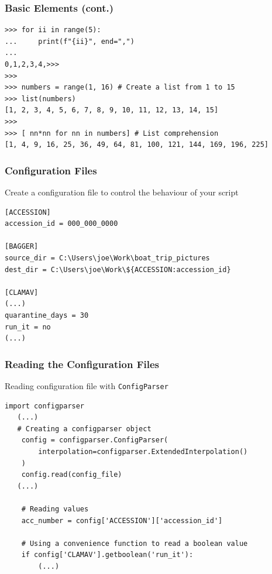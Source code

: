 \documentclass[aspectratio=169]{beamer}
\begin{document}
\begin{frame}[fragile]
\frametitle{Basic Elements (cont.)}
\scriptsize
\begin{verbatim}
>>> for ii in range(5):
...     print(f"{ii}", end=",")
...
0,1,2,3,4,>>>
>>>
>>> numbers = range(1, 16) # Create a list from 1 to 15
>>> list(numbers)
[1, 2, 3, 4, 5, 6, 7, 8, 9, 10, 11, 12, 13, 14, 15]
>>>
>>> [ nn*nn for nn in numbers] # List comprehension
[1, 4, 9, 16, 25, 36, 49, 64, 81, 100, 121, 144, 169, 196, 225]
\end{verbatim}
\normalsize
\end{frame}


\begin{frame}[fragile]
\frametitle{Configuration Files}
Create a configuration file to control the behaviour of your script

\scriptsize
\begin{verbatim}
[ACCESSION]
accession_id = 000_000_0000

[BAGGER]
source_dir = C:\Users\joe\Work\boat_trip_pictures
dest_dir = C:\Users\joe\Work\${ACCESSION:accession_id}

[CLAMAV]
(...)
quarantine_days = 30
run_it = no
(...)
\end{verbatim}
\normalsize
\end{frame}

\begin{frame}[fragile]
\frametitle{Reading the Configuration Files}
Reading configuration file with \texttt{ConfigParser}

\scriptsize
\begin{verbatim}
import configparser
   (...)
   # Creating a configparser object
    config = configparser.ConfigParser(
        interpolation=configparser.ExtendedInterpolation()
    )
    config.read(config_file)
   (...)

    # Reading values
    acc_number = config['ACCESSION']['accession_id']

    # Using a convenience function to read a boolean value
    if config['CLAMAV'].getboolean('run_it'):
        (...)
\end{verbatim}
\normalsize
\end{frame}
\end{document}
